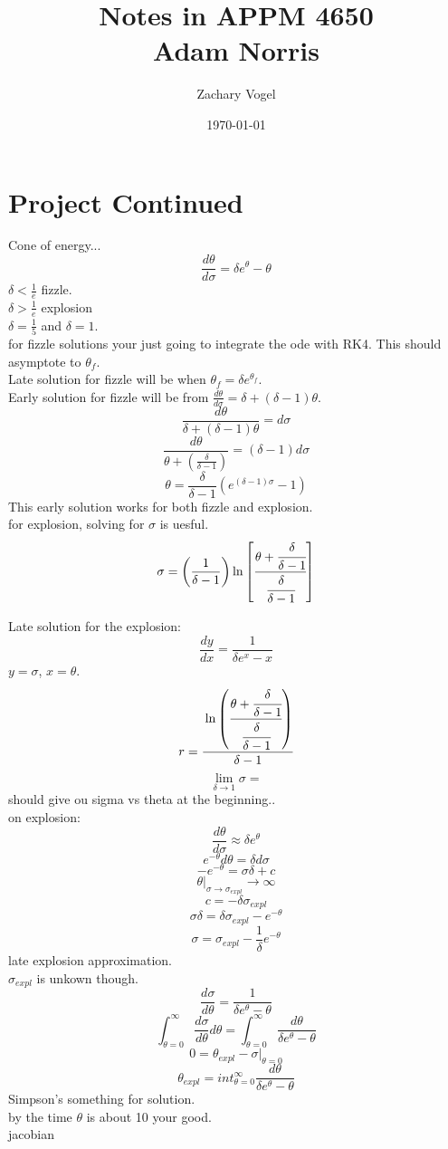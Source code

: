 \documentclass{article}
\begin{document}
\author{Zachary Vogel}
\date{\today}
\title{Notes in APPM 4650\\Adam Norris}

\maketitle

\section{Project Continued}
Cone of energy...\\
\[\frac{d\theta}{d\sigma}=\delta e^{\theta}-\theta\]
$\delta<\frac{1}{e}$ fizzle.\\
$\delta>\frac{1}{e}$ explosion\\
$\delta=\frac{1}{5}$ and $\delta=1$.\\
for fizzle solutions your just going to integrate the ode with RK4. This should asymptote to $\theta_f$.\\
Late solution for fizzle will be when $\theta_f=\delta e^{\theta_f}$.\\
Early solution for fizzle will be from $\frac{d\theta}{d\sigma}=\delta+(\delta-1)\theta$.\\
\[\frac{d\theta}{\delta+(\delta-1)\theta}=d\sigma\]
\[\frac{d\theta}{\theta+(\frac{\delta}{\delta-1})}=(\delta-1)d\sigma\]
\[\theta=\frac{\delta}{\delta-1}(e^{(\delta-1)\sigma}-1)\]
This early solution works for both fizzle and explosion.\\
for explosion, solving for $\sigma$ is uesful.\\
\[\sigma=\left (\frac{1}{\delta-1}\right)\ln\left [\cfrac{\theta+\cfrac{\delta}{\delta-1}}{\cfrac{\delta}{\delta-1}}\right ]\]

Late solution for the explosion:\\
\[\frac{dy}{dx}=\frac{1}{\delta e^{x}-x}\]
$y=\sigma$, $x=\theta$.\\
\[r=\cfrac{\ln\left (\cfrac{\theta+\cfrac{\delta}{\delta-1}}{\cfrac{\delta}{\delta-1}}\right)}{\delta-1}\]
\[\lim_{\delta\to 1}\sigma=\]
should give ou sigma vs theta at the beginning..\\

on explosion:\\
\[\frac{d\theta}{d\sigma}\approx \delta e^{\theta}\]
\[e^{-\theta}d\theta=\delta d\sigma\]
\[-e^{-\theta}=\sigma\delta+c\]
\[\theta\bigg|_{\sigma\to\sigma_{expl}}\to\infty\]
\[c=-\delta \sigma_{expl}\]
\[\sigma \delta=\delta\sigma_{expl}-e^{-\theta}\]
\[\sigma=\sigma_{expl}-\frac{1}{\delta}e^{-\theta}\]
late explosion approximation.\\
$\sigma_{expl}$ is unkown though.\\
\[\frac{d\sigma}{d\theta}=\frac{1}{\delta e^{\theta}-\theta}\]
\[\int_{\theta=0}^\infty\frac{d\sigma}{d\theta}d\theta=\int_{\theta=0}^\infty\frac{d\theta}{\delta e^{\theta}-\theta}\]
\[0=\theta_{expl}-\sigma\bigg|_{\theta=0}\]
\[\theta_{expl}=int_{\theta=0}^\infty \frac{d\theta}{\delta e^{\theta}-\theta}\]
Simpson's something for solution.\\
by the time $\theta$ is about 10 your good.\\jacobian
\end{document}
